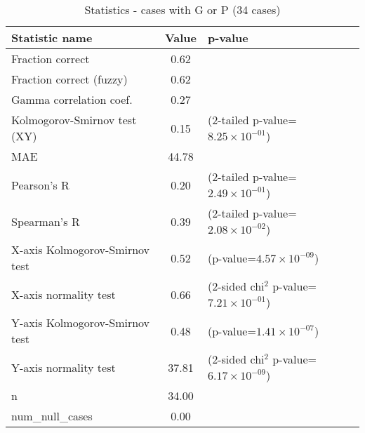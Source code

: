 \documentclass[10pt, letterpaper, oneside, titlepage, landscape]{scrreprt}
\begin{document}
\begin{table}[H]\begin{center}
\begin{tabular}{ l S[table-format=3.2] l}
Statistic name & {Value} & p-value\\
\hline
Fraction correct & 0.62 & \\
Fraction correct (fuzzy) & 0.62 & \\
Gamma correlation coef. & 0.27 & \\
Kolmogorov-Smirnov test (XY) & 0.15 & (2-tailed p-value=$8.25\times10^{-01}$)\\
MAE & 44.78 & \\
Pearson's R & 0.20 & (2-tailed p-value=$2.49\times10^{-01}$)\\
Spearman's R & 0.39 & (2-tailed p-value=$2.08\times10^{-02}$)\\
X-axis Kolmogorov-Smirnov test & 0.52 & (p-value=$4.57\times10^{-09}$)\\
X-axis normality test & 0.66 & (2-sided chi$^{2}$ p-value=$7.21\times10^{-01}$)\\
Y-axis Kolmogorov-Smirnov test & 0.48 & (p-value=$1.41\times10^{-07}$)\\
Y-axis normality test & 37.81 & (2-sided chi$^{2}$ p-value=$6.17\times10^{-09}$)\\
n & 34.00 & \\
num\_null\_cases & 0.00 & \\
\end{tabular}
\caption{Statistics - cases with G or P (34 cases)}
\end{center}\end{table}
\end{document}
